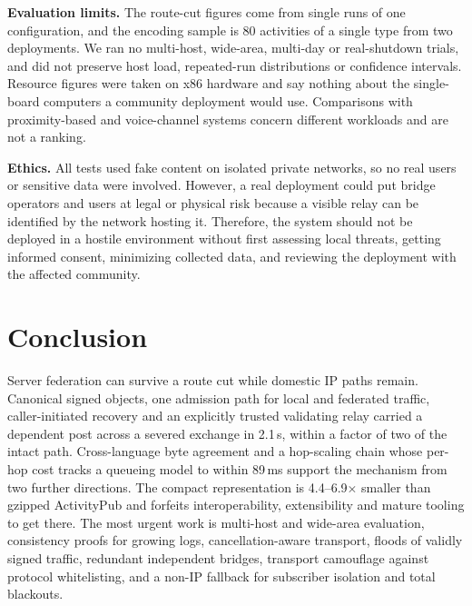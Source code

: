 \documentclass[conference,a4paper]{IEEEtran}
\begin{document}
\textbf{Evaluation limits.} The route-cut figures come from single runs of one configuration, and the encoding sample is 80 activities of a single type from two deployments. We ran no multi-host, wide-area, multi-day or real-shutdown trials, and did not preserve host load, repeated-run distributions or confidence intervals. Resource figures were taken on x86 hardware and say nothing about the single-board computers a community deployment would use. Comparisons with proximity-based and voice-channel systems concern different workloads and are not a ranking.

\textbf{Ethics.} All tests used fake content on isolated private networks, so no real users or sensitive data were involved. However, a real deployment could put bridge operators and users at legal or physical risk because a visible relay can be identified by the network hosting it. Therefore, the system should not be deployed in a hostile environment without first assessing local threats, getting informed consent, minimizing collected data, and reviewing the deployment with the affected community.

\section{Conclusion}

Server federation can survive a route cut while domestic IP paths remain. Canonical signed objects, one admission path for local and federated traffic, caller-initiated recovery and an explicitly trusted validating relay carried a dependent post across a severed exchange in 2.1\,s, within a factor of two of the intact path. Cross-language byte agreement and a hop-scaling chain whose per-hop cost tracks a queueing model to within 89\,ms support the mechanism from two further directions. The compact representation is 4.4--6.9$\times$ smaller than gzipped ActivityPub and forfeits interoperability, extensibility and mature tooling to get there. The most urgent work is multi-host and wide-area evaluation, consistency proofs for growing logs, cancellation-aware transport, floods of validly signed traffic, redundant independent bridges, transport camouflage against protocol whitelisting, and a non-IP fallback for subscriber isolation and total blackouts.



\end{document}
